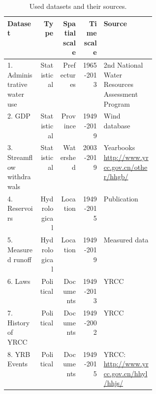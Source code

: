 \begin{table}[!htbp]
    \begin{center}
    \caption{Used datasets and their sources.}\label{tab:datasets}%
    \begin{tabular}{lrrrp{0.35\linewidth}}
    \hline
    Dataset & Type & Spatial scale & Time scale & Source \\
    \hline
    1. Administrative water use & Statistical & Prefectures & 1965-2013 & 2nd National Water Resources Assessment Program \cite{zhou2020}\\
    2. GDP & Statistical & Province & 1949-2019 & Wind database \\
    3. Streamflow withdrawals & Statistical & Watershed & 2003-2019 & Yearbooks \url{http://www.yrcc.gov.cn/other/hhgb/} \\
    4. Reservoirs & Hydrological & Location & 1949-2015 & Publication \cite{wang2019c} \\
    5. Measured runoff & Hydrological & Location & 1949-2019 & Measured data \cite{wang2019c,wang2016e} \\
    6. Laws & Political & Documents & 1949-2013 & YRCC \cite{yellowriverconservancycommission2013} \\
    7. History of YRCC & Political & Documents & 1949-2002 & YRCC \cite{yellowriverarchives2004} \\
    8. YRB Events & Political & Documents & 1949-2015 & YRCC: \url{http://www.yrcc.gov.cn/hhyl/hhjs/} \\
    \hline
    \end{tabular}
    \end{center}
    \end{table}

